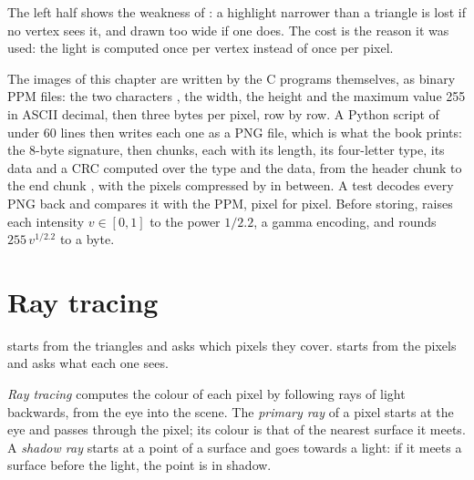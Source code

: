 \label{out:b3:computer-graphics:shade}


The left half shows the weakness of : a highlight narrower than a triangle is lost if no vertex sees it, and drawn too wide if one does. The cost is the reason it was used: the light is computed once per vertex instead of once per pixel.

\begin{inpractice}
The images of this chapter are written by the C programs themselves, as binary PPM files: the two characters , the width, the height and the maximum value 255 in ASCII decimal, then three bytes per pixel, row by row. A Python script of under 60 lines then writes each one as a PNG file, which is what the book prints: the 8-byte signature, then chunks, each with its length, its four-letter type, its data and a CRC computed over the type and the data, from the header chunk  to the end chunk , with the pixels compressed by  in between. A test decodes every PNG back and compares it with the PPM, pixel for pixel. Before storing,  raises each intensity $v \in [0, 1]$ to the power $1/2.2$, a gamma encoding, and rounds $255\,v^{1/2.2}$ to a byte. %
\end{inpractice}

\section{Ray tracing}\label{sec:b3:computer-graphics:rays}

 starts from the triangles and asks which pixels they cover.  starts from the pixels and asks what each one sees.

\begin{definition}\label{def:b3:computer-graphics:rays}
\emph{Ray tracing} computes the colour of each pixel by following rays of light backwards, from the eye into the scene. The \emph{primary ray} of a pixel starts at the eye and passes through the pixel; its colour is that of the nearest surface it meets. A \emph{shadow ray} starts at a point of a surface and goes towards a light: if it meets a surface before the light, the point is in shadow.
\end{definition}

